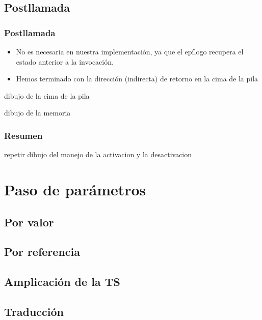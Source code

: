 \documentclass[hyperref={pdfpagelabels=false},tree-dvips]{beamer}
\begin{document}
\subsection{Postllamada}
\begin{frame}[fragile]
\frametitle{Postllamada}

\begin{itemize}[<+->]
	\item No es necesaria en nuestra implementación, ya que el epílogo recupera el estado anterior a la invocación.
	\item Hemos terminado con la dirección (indirecta) de retorno en la cima de la pila
\end{itemize}
dibujo de la cima de la pila

dibujo de la memoria

\end{frame}
\begin{frame}[fragile]
\frametitle{Resumen}

repetir dibujo del manejo de la activacion y la desactivacion

\end{frame}

\section{Paso de parámetros}
\subsection{Por valor}
\subsection{Por referencia}
\subsection{Amplicación de la TS}
\subsection{Traducción}



\end{document}
